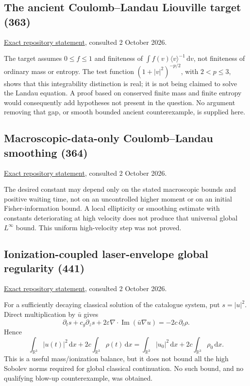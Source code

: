 \documentclass[11pt,a4paper]{article}
\numberwithin{equation}{section}
\theoremstyle{remark}\newtheorem{remark}[theorem]{Remark}
\newcommand{\R}{\mathbb R}\newcommand{\C}{\mathbb C}\newcommand{\T}{\mathbb T}
\newcommand{\dd}{\,\mathrm d}
\DeclareMathOperator{\Ima}{Im}
\begin{document}
\subsection{The ancient Coulomb--Landau Liouville target (363)}
\href{https://raw.githubusercontent.com/MColbrook/AIM/main/problems/363-landau-ancient-liouville.md}{Exact repository statement}, consulted 2 October 2026.\par
The target assumes $0\leq f\leq1$ and finiteness of $\int f(v)\langle v\rangle^{-1}\dd v$, not finiteness of ordinary mass or entropy. The test function $(1+|v|^2)^{-p/2}$, with $2<p\leq3$, shows that this integrability distinction is real; it is not being claimed to solve the Landau equation. A proof based on conserved finite mass and finite entropy would consequently add hypotheses not present in the question. No argument removing that gap, or smooth bounded ancient counterexample, is supplied here.

\subsection{Macroscopic-data-only Coulomb--Landau smoothing (364)}
\href{https://raw.githubusercontent.com/MColbrook/AIM/main/problems/364-landau-macroscopic-smoothing.md}{Exact repository statement}, consulted 2 October 2026.\par
The desired constant may depend only on the stated macroscopic bounds and positive waiting time, not on an uncontrolled higher moment or on an initial Fisher-information bound. A local ellipticity or smoothing estimate with constants deteriorating at high velocity does not produce that universal global $L^\infty$ bound. This uniform high-velocity step was not proved.

\subsection{Ionization-coupled laser-envelope global regularity (441)}
\href{https://raw.githubusercontent.com/MColbrook/AIM/main/problems/441-ionization-laser-envelope-global-regularity.md}{Exact repository statement}, consulted 2 October 2026.\par
For a sufficiently decaying classical solution of the catalogue system, put $s=|u|^2$. Direct multiplication by $\bar u$ gives
\[
 \partial_t s+c_g\partial_z s+
 2\varepsilon\nabla\!\cdot\!\Ima(\bar u\nabla u)
 =-2c\,\partial_t\rho.
\]
Hence
\[
 \int_{\R^3}|u(t)|^2\dd x+2c\int_{\R^3}\rho(t)\dd x
 =\int_{\R^3}|u_0|^2\dd x+2c\int_{\R^3}\rho_0\dd x.
\]
This is a useful mass/ionization balance, but it does not bound all the high Sobolev norms required for global classical continuation. No such bound, and no qualifying blow-up counterexample, was obtained.
\end{document}
